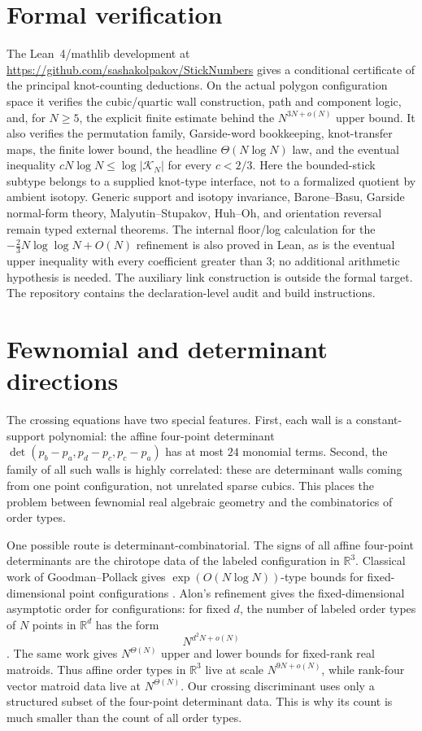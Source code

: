 \documentclass[11pt]{article}
\theoremstyle{remark}
\theoremstyle{plain}
\newcommand{\R}{\mathbb{R}}
\newcommand{\Kcal}{\mathcal{K}}
\begin{document}
\section{Formal verification}

The Lean~4/mathlib development at
\url{https://github.com/sashakolpakov/StickNumbers} gives a conditional
certificate of the principal knot-counting deductions.  On the actual polygon
configuration space it verifies the cubic/quartic wall construction, path and
component logic, and, for \(N\ge5\), the explicit finite estimate behind the
\(N^{3N+o(N)}\) upper bound.  It also verifies the permutation family,
Garside-word bookkeeping, knot-transfer maps, the finite lower bound, the
headline \(\Theta(N\log N)\) law, and the eventual inequality
\(cN\log N\le\log|\Kcal_N|\) for every \(c<2/3\).  Here the bounded-stick
subtype belongs to a supplied knot-type interface, not to a formalized quotient
by ambient isotopy.  Generic support and isotopy invariance, Barone--Basu,
Garside normal-form theory, Malyutin--Stupakov, Huh--Oh, and orientation
reversal remain typed external theorems.  The internal floor/log calculation
for the \(-\frac23N\log\log N+O(N)\) refinement is also proved in Lean,
as is the eventual upper inequality with every coefficient greater than
\(3\); no additional arithmetic hypothesis is needed.  The auxiliary link
construction is outside the formal target.  The
repository contains the declaration-level audit and build instructions.

\section{Fewnomial and determinant directions}

The crossing equations have two special features.  First, each wall is a
constant-support polynomial: the affine four-point determinant
\(\det(p_b-p_a,p_d-p_c,p_c-p_a)\) has at most \(24\) monomial terms.  Second,
the family of all such walls is highly correlated: these are determinant walls
coming from one point configuration, not unrelated sparse cubics.  This places
the problem between fewnomial real algebraic geometry and the combinatorics of
order types.

One possible route is determinant-combinatorial.  The signs of all affine
four-point determinants are the chirotope data of the labeled configuration in
\(\R^3\).  Classical work of Goodman--Pollack gives
\(\exp(O(N\log N))\)-type bounds for fixed-dimensional point configurations
\cite{GoodmanPollack}.  Alon's refinement gives the fixed-dimensional
asymptotic order for configurations: for fixed \(d\), the number of labeled
order types of \(N\) points in \(\R^d\) has the form
\[
    N^{d^2N+o(N)}
\]
\cite{AlonMatroids}.  The same work gives \(N^{\Theta(N)}\) upper and lower
bounds for fixed-rank real matroids.  Thus affine order types in \(\R^3\) live
at scale \(N^{9N+o(N)}\), while rank-four vector matroid data live at
\(N^{\Theta(N)}\).  Our crossing discriminant uses only a structured subset of
the four-point determinant data.  This is why its count is much smaller than
the count of all order types.
\end{document}
